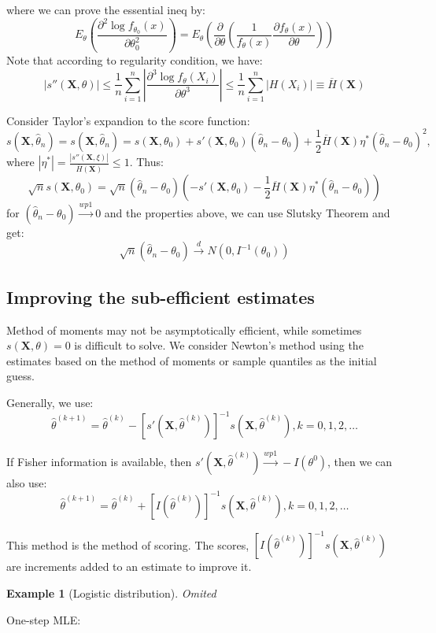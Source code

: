 \documentclass{ctexart}
\newtheorem{example}{Example}[subsection]
\begin{document}
where we can prove the essential ineq by: 
\[
E_{\theta}(\frac{\partial^{2} \log f_{\theta_{0}}(x)}{\partial \theta_{0}^{2}} )=E_{\theta}(\frac{\partial }{\partial \theta} (\frac{1}{f_{\theta}(x)}\frac{\partial f_{\theta}(x)}{\partial \theta} ))
\] 
Note that according to regularity condition, we have: 
\[
|s''(\boldsymbol{X},\theta)|\le \frac{1}{n}\sum_{i=1}^{n} |\frac{\partial ^{3}\log f_{\theta}(X_{i})}{\partial \theta^{3}} |\le \frac{1}{n}\sum_{i=1}^{n} |H(X_{i})|\equiv \overline{H}(\boldsymbol{X})
\] 

Consider Taylor's expandion to the score function: 
\[
s(\boldsymbol{X},\hat{\theta}_{n})=s(\boldsymbol{X},\hat{\theta}_{n})=s(\boldsymbol{X},\theta_{0})+s'(\boldsymbol{X},\theta_{0})(\hat{\theta}_{n}-\theta_{0})+\frac{1}{2}\overline{H}(\boldsymbol{X})\eta^{*}(\hat{\theta}_{n}-\theta_{0})^{2}, 
\] 
where \(|\eta^{*}|=\frac{|s''(\boldsymbol{X},\xi)|}{\overline{H}(\boldsymbol{X})}\le 1\). Thus: 
\[
\sqrt{n}s(\boldsymbol{X},\theta_{0})=\sqrt{n}(\hat{\theta}_{n}-\theta_{0})\left( -s'(\boldsymbol{X},\theta_{0})-\frac{1}{2}\overline{H}(\boldsymbol{X})\eta^{*}(\hat{\theta}_{n}-\theta_{0}) \right)
\] 
for \((\hat{\theta}_{n}-\theta_{0})\xrightarrow{wp1}0\) and the properties above, we can use Slutsky Theorem and get: 
\[
\sqrt{n}(\hat{\theta}_{n}-\theta_{0})\xrightarrow{d}N(0,I ^{-1}(\theta_{0}))
\] 
\subsection{Improving the sub-efficient estimates}
Method of moments may not be asymptotically efficient, while sometimes \(s(\boldsymbol{X},\theta)=0\) is difficult to solve. We consider Newton's method using the estimates based on the method of moments or sample quantiles as the initial guess. 

Generally, we use: 
\[
\hat{\theta}^{(k+1)}  =\hat{\theta}^{(k)}-[s'(\boldsymbol{X},\hat{\theta}^{(k)})]^{-1}s(\boldsymbol{X},\hat{\theta}^{(k)}),k=0,1,2,\ldots
\] 

If Fisher information is available, then \(s'(\boldsymbol{X},\hat{\theta}^{(k)})\xrightarrow{wp1}-I(\theta^{0})\), then we can also use: 
\[
\hat{\theta}^{(k+1)}  =\hat{\theta}^{(k)}+[I(\hat{\theta}^{(k)})]^{-1} s(\boldsymbol{X},\hat{\theta}^{(k)}),k=0,1,2,\ldots
\] 

This method is the method of scoring. The scores, \([I(\hat{\theta}^{(k)})]^{-1} s(\boldsymbol{X},\hat{\theta}^{(k)})\) are increments added to an estimate to improve it. 

\begin{example}[Logistic distribution]
  Omited
\end{example}
One-step MLE: 
\end{document}

